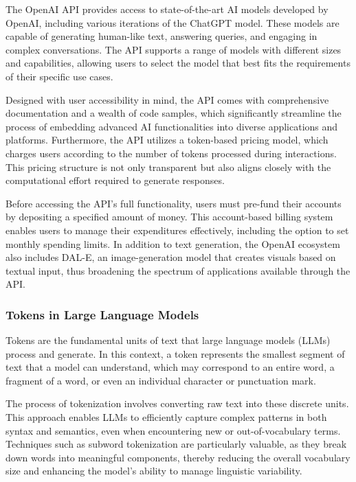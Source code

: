 The OpenAI API provides access to state-of-the-art AI models developed by OpenAI, including various iterations of the ChatGPT model. 
These models are capable of generating human-like text, answering queries, and engaging in complex conversations. 
The API supports a range of models with different sizes and capabilities, allowing users to select the model that best fits 
the requirements of their specific use cases.

Designed with user accessibility in mind, the API comes with comprehensive documentation and a wealth of code samples, 
which significantly streamline the process of embedding advanced AI functionalities into diverse applications and platforms. 
Furthermore, the API utilizes a token-based pricing model, which charges users according to the number of tokens processed during interactions. 
This pricing structure is not only transparent but also aligns closely with the computational effort required to generate responses.

Before accessing the API's full functionality, users must pre-fund their accounts by depositing a specified amount of money. 
This account-based billing system enables users to manage their expenditures effectively, including the option to set monthly spending limits. 
In addition to text generation, the OpenAI ecosystem also includes DAL-E, an image-generation model that creates visuals based on textual input, 
thus broadening the spectrum of applications available through the API.

\cite{OpenAI-API-Documentation}

\subsubsection{Tokens in Large Language Models}

Tokens are the fundamental units of text that large language models (LLMs) process and generate. 
In this context, a token represents the smallest segment of text that a model can understand, which may correspond to an entire word, 
a fragment of a word, or even an individual character or punctuation mark. 

The process of tokenization involves converting raw text into these discrete units. 
This approach enables LLMs to efficiently capture complex patterns in both syntax and semantics, even when encountering new or out-of-vocabulary terms. 
Techniques such as subword tokenization are particularly valuable, as they break down words into meaningful components, 
thereby reducing the overall vocabulary size and enhancing the model's ability to manage linguistic variability.


